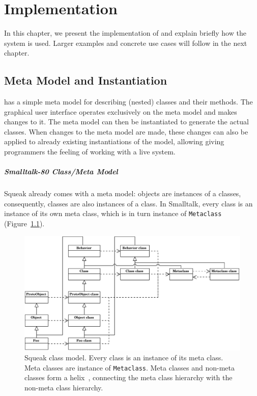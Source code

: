 \chapter{Implementation}
\label{sec:impl}
In this chapter, we present the implementation of \msname and explain briefly how the system is used. Larger examples and concrete use cases will follow in the next chapter.

\section{Meta Model and Instantiation}
\label{sec:impl_meta_model}
\msname has a simple meta model for describing (nested) classes and their methods. The graphical user interface operates exclusively on the meta model and makes changes to it. The meta model can then be instantiated to generate the actual classes. When changes to the meta model are made, these changes can also be applied to already existing instantiations of the model, allowing giving programmers the feeling of working with a live system.

\paragraph{Smalltalk-80 Class/Meta Model}
Squeak already comes with a meta model: objects are instances of a classes, consequently, classes are also instances of a class. In Smalltalk, every class is an instance of its own meta class, which is in turn instance of \texttt{Metaclass} (Figure~\ref{fig:impl_squeak_meta}).

\begin{figure}
	\includegraphics[width=\textwidth]{squeak_meta.pdf}
	\centering
	\caption[Squeak class model]{Squeak class model. Every class is an instance of its meta class. Meta classes are instance of \texttt{Metaclass}. Meta classes and non-meta classes form a helix~\cite{Briot:1989:PEM:74877.74921}, connecting the meta class hierarchy with the non-meta class hierarchy.}
	\label{fig:impl_squeak_meta}
\end{figure}

